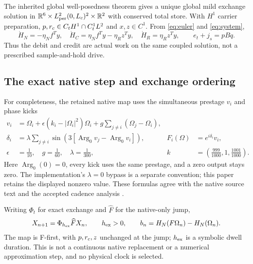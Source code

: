 The inherited global well-posedness theorem \cite{RX} gives a unique global mild exchange solution in $\mathbb R^6\times L^2_{\rm per}(0,L_c)^2\times\mathbb R^2$ with conserved total store. With $H^1$ carrier preparation, $p,r_c\in C_tH^1\cap C_t^1L^2$ and $x,z\in C^1$. From \eqref{eq:euler} and \eqref{eq:system},
\begin{equation}\label{eq:globalwork}
 \dot H_N=-\eta_Nf^Ty,\quad
 \dot H_C=\eta_Nf^Ty-\eta_Rz^Ty,\quad
 \dot H_R=\eta_Rz^Ty,\qquad e_t+j_s=pBq.
\end{equation}
Thus the debit and credit are actual work on the same coupled solution, not a prescribed sample-and-hold drive.

\subsection{The exact native step and exchange ordering}\label{sec:hybrid}
For completeness, the retained native map uses the simultaneous prestage $v_i$ and phase kicks
\begin{equation}\label{eq:native}
 \begin{aligned}
 v_i&=\Omega_i+\epsilon(k_i-|\Omega_i|^2)\Omega_i
       +g\sum_{j\ne i}(\Omega_j-\Omega_i),\\
 \delta_i&=\lambda\sum_{j\ne i}\sin\!\left(3[\operatorname{Arg}_0v_j-\operatorname{Arg}_0v_i]\right),
 & F_i(\Omega)&=e^{i\delta_i}v_i,\\
 \epsilon&=\frac1{10},\quad g=\frac1{60},\quad\lambda=\frac1{300},
 & k&=\left(\frac{999}{1000},1,\frac{1001}{1000}\right).
 \end{aligned}
\end{equation}
Here $\operatorname{Arg}_0(0)=0$, every kick uses the same prestage, and a zero output stays zero. The implementation's $\lambda=0$ bypass is a separate convention; this paper retains the displayed nonzero value. These formulas agree with the native source text and the accepted cadence analysis \cite{F}.

Writing $\Phi_t$ for exact exchange and $\widehat F$ for the native-only jump,
\begin{equation}\label{eq:hybrid}
 X_{n+1}=\Phi_{h_{\rm ex}}\widehat F X_n,\qquad h_{\rm ex}>0,
 \qquad b_n=H_N(F\Omega_n)-H_N(\Omega_n).
\end{equation}
The map is F-first, with $p,r_c,z$ unchanged at the jump; $h_{\rm ex}$ is a symbolic dwell duration. This is not a continuous native replacement or a numerical approximation step, and no physical clock is selected.
